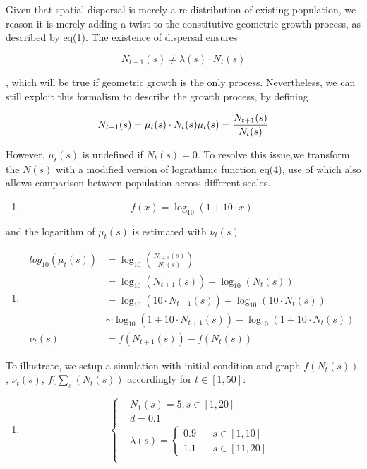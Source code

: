 \documentclass[a4paperpaper,]{article}
\providecommand{\tightlist}{%
  \setlength{\itemsep}{0pt}\setlength{\parskip}{0pt}}
\begin{document}
Given that spatial dispersal is merely a re-distribution of existing
population, we reason it is merely adding a twist to the constitutive
geometric growth process, as described by eq(1). The existence of
dispersal ensures

\[
N_{t+1}(s) \neq \lambda(s) \cdot  N_{t}(s) 
\]

, which will be true if geometric growth is the only process.
Nevertheless, we can still exploit this formalism to describe the growth
process, by defining

\[
N_{t+1}(s) = \mu_t(s) \cdot N_{t}(s)  \\
\mu_t(s)   =  \frac{N_{t+1}(s)}{N_{t}(s)}
\]

However, \(\mu_t(s)\) is undefined if \(N_t(s)=0\). To resolve this
issue,we transform the \(N(s)\) with a modified version of lograthmic
function eq(4), use of which also allows comparison between population
across different scales.

\begin{enumerate}
\def\labelenumi{(\arabic{enumi})}
\setcounter{enumi}{3}
\tightlist
\item
  \[
  f(x) = \log_{10}(1+10\cdot x) 
  \]
\end{enumerate}

and the logarithm of \(\mu_t(s)\) is estimated with \(\nu_t(s)\)

\begin{enumerate}
\def\labelenumi{(\arabic{enumi})}
\setcounter{enumi}{4}
\tightlist
\item
  \[
  \begin{aligned}
    log_{10}(\mu_t(s)) &= \log_{10}(\frac{N_{t+1}(s)}{N_{t}(s)})  \\
                   &= \log_{10}(N_{t+1}(s)) - \log_{10}(N_{t}(s)) \\
                   &= \log_{10}(10\cdot N_{t+1}(s)) - \log_{10}(10 \cdot N_{t}(s)) \\
                   &\sim \log_{10}(1+10\cdot N_{t+1}(s)) - \log_{10}(1+10\cdot N_{t}(s))\\
          \nu_t(s) &= f(N_{t+1}(s)) - f(N_{t}(s))
  \end{aligned}
  \]
\end{enumerate}

To illustrate, we setup a simulation with initial condition and graph
\(f(N_t(s))\), \(\nu_t(s)\), \(f(\sum_s(N_t(s))\) accordingly for
\(t \in [1,50]\):

\begin{enumerate}
\def\labelenumi{(\arabic{enumi})}
\setcounter{enumi}{5}
\tightlist
\item
  \[
  \left\{
    \begin{aligned}
  & N_1(s)=5, s \in [1,20] \\
  & d = 0.1 \\
  & \lambda(s)  = 
  \left\{
  \begin{aligned}
  0.9 &~~~~ s \in [1,10]\\ 
  1.1 &~~~~ s \in [11,20]
  \end{aligned}\right. \\
    \end{aligned}
  \right.
  \]
\end{enumerate}
\end{document}
